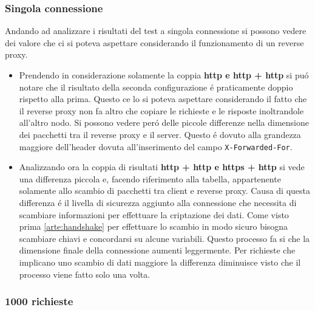 \subsubsection{Singola connessione}
Andando ad analizzare i risultati del test a singola connessione si possono vedere dei valore che ci si poteva aspettare considerando il funzionamento di un reverse proxy.
\begin{itemize}
  \item Prendendo in considerazione solamente la coppia \textbf{http e http + http} si puó notare che il risultato della seconda configurazione é praticamente doppio rispetto alla prima. Questo ce lo si poteva aspettare considerando il fatto che il reverse proxy non fa altro che copiare le richieste e le risposte inoltrandole all'altro nodo. Si possono vedere peró delle piccole differenze nella dimensione dei pacchetti tra il reverse proxy e il server. Questo é dovuto alla grandezza maggiore dell'header dovuta all'inserimento del campo \texttt{X-Forwarded-For}.
  \item Analizzando ora la coppia di risultati \textbf{http + http e https + http} si vede una differenza piccola e, facendo riferimento alla tabella, appartenente solamente allo scambio di pacchetti tra client e reverse proxy. Causa di questa differenza é il livella di sicurezza aggiunto alla connessione che necessita di scambiare informazioni per effettuare la criptazione dei dati. Come visto prima \ref{arte:handshake} per effettuare lo scambio in modo sicuro bisogna scambiare chiavi e concordarsi su alcune variabili. Questo processo fa si che la dimensione finale della connessione aumenti leggermente. Per richieste che implicano uno scambio di dati maggiore la differenza diminuisce visto che il processo viene fatto solo una volta.
\end{itemize}

\subsubsection{1000 richieste}
